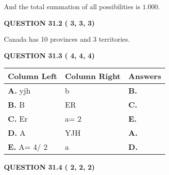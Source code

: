 \documentclass[12pt]{article}
\begin{document}
\noindent
 And the total summation of all possibilities is $  %
1.000 $.
 
 
 
  
\vspace{0.2in}
  
{\textbf{\Large{QUESTION
31.2 
 (          3,          3,          3)
}}}
  
  
 
 
\noindent{}
 
 
Canada has  %
10 provinces and  %
3 territories.
 
 
 
 
  
\vspace{0.2in}
  
{\textbf{\Large{QUESTION
31.3 
 (          4,          4,          4)
}}}
  
  
 
 
\noindent{}
  
  
\begin{tabular}{|l|l|l|}
 \hline
 Column Left & Column Right  & Answers       \\ 
 \hline
{\textbf{\large{
A.}}}
yjh
  & 
b
 & 
{\textbf{\large{
B.}}}
 \\ 
 \hline
{\textbf{\large{
B.}}}
B
  & 
ER
 & 
{\textbf{\large{
C.}}}
 \\ 
 \hline
{\textbf{\large{
C.}}}
Er
  & 
 a= %
2
 & 
{\textbf{\large{
E.}}}
 \\ 
 \hline
{\textbf{\large{
D.}}}
A
  & 
YJH
 & 
{\textbf{\large{
A.}}}
 \\ 
 \hline
{\textbf{\large{
E.}}}
 A= %
4/ %
2

  & 
a
 & 
{\textbf{\large{
D.}}}
 \\ 
 \hline
 \end{tabular}
  
  
 
 
 
 
  
\vspace{0.2in}
  
{\textbf{\Large{QUESTION
31.4 
 (          2,          2,          2)
}}}
  
  
 
 
\noindent{}
 
\end{document}
